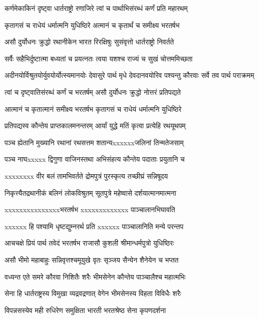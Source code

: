 \twolineshloka
{कर्णमेकाकिनं दृष्ट्वा धार्तराष्ट्रो रणाजिरे}
{त्वां च पार्थाभिसंरब्धं कर्णं प्रति महारथम्}


\twolineshloka
{कृतागसं च राधेयं धर्मात्मनि युधिष्ठिरे}
{अत्मानं च कृतार्थं च समीक्ष्य भरतर्षभ}


\twolineshloka
{असौ दुर्योधनः क्रुद्धो रथानीकेन भारत}
{रिरक्षिषुः सुसंवृत्तो धार्तराष्ट्रो निवर्तते}


\twolineshloka
{सर्वैः सहैभिर्दुष्टात्मा बध्यतां च प्रयत्नतः}
{त्वया यशश्च राज्यं च सुखं चोत्तममिच्छता}


\threelineshloka
{अदीनयोर्विश्रुतयोर्युवयोर्योत्स्यमानयोः}
{देवासुरे पार्थ मृधे देवदानवयोरिव}
{पश्यन्तु कौरवाः सर्वे तव पार्थ पराक्रमम्}


\twolineshloka
{त्वां च दृष्ट्वातिसंरब्धं कर्णं च भरतर्षम्}
{असौ दुर्योधनः क्रुद्धो नोत्तरं प्रतिपद्यते}


\twolineshloka
{आत्मानं च कृतात्मानं समीक्ष्य भरतर्षभ}
{कृतागसं च राधेयं धर्मात्मनि युधिष्ठिरे}


\twolineshloka
{प्रतिपद्यस्व कौन्तेय प्राप्तकालमनन्तरम्}
{आर्यां युद्धे मतिं कृत्वा प्रत्येहि रथयूथपम्}


\twolineshloka
{पञ्च ह्येतानि मुख्यानि रथानां रथसत्तम}
{शतान्यxxxxxxजलिनां तिन्मतेजसाम्}


\twolineshloka
{पञ्च नाघxxxxx द्विगुणा वाजिनस्तथा}
{अभिसंहत्य कौन्तेय पदाताः प्रयुतानि च}


\twolineshloka
{xxxxxxxx वीर बलं तामभिवर्तते}
{द्रोमपुत्रं पुरस्कृत्य तच्छीघ्रं सन्निषूदय}


\twolineshloka
{निकृत्त्यैतद्रथानीकं बलिनं लोकविश्रुतम्}
{सूतपुत्रे महेष्वासे दर्शयात्मानमात्मना}


\threelineshloka
{xxxxxxxxxxxxxxxभरतर्षभ}
{xxxxxxxxxxxxx पाञ्चालानभिघावति}
{}


\twolineshloka
{xxxxxx हि पश्यामि धृष्टद्युम्नरर्थ प्रति}
{xxxxxx पाञ्चालानिति मन्ये परन्तप}


\twolineshloka
{आचचक्षे प्रियं पार्थ तवेदं भरतर्षभ}
{राजासौ कुशली श्रीमान्धर्मपुत्रो युधिष्ठिरः}


\twolineshloka
{असौ भीमो महाबाहुः सन्निवृत्तश्चमूयुखे}
{वृतः सृञ्जय सैन्येन शैनेयेन च भप्तत}


\twolineshloka
{वध्यन्त एते समरे कौरवा निशितैः शरैः}
{भीमसेनेन कौन्तेय पाञ्चालैश्च महात्मभिः}


\twolineshloka
{सेना हि धार्तराष्ट्रस्य विमुखा व्यद्रवद्रणात्}
{वेगेन भीमसेनस्य विहता विविधैः शरैः}


\twolineshloka
{विपन्नसस्येव मही रुधिरेण समुक्षिता}
{भारती भरतश्रेष्ठ सेना कृपणदर्शना}


